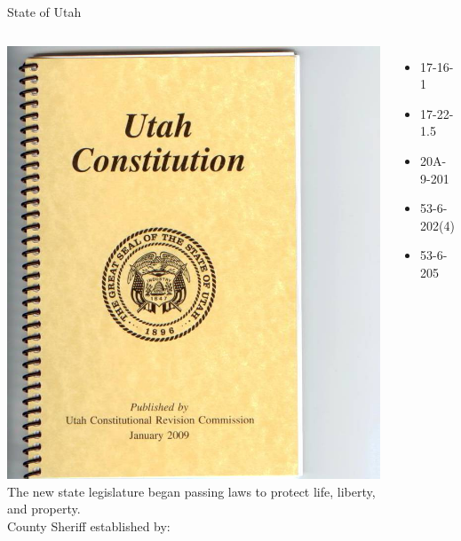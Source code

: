 \begin{frame}{State of Utah}
    \begin{columns}[onlytextwidth]
            \centering
            \includegraphics[height=0.75\textheight]{img/utah-constitution.png} \\

            The new state legislature began passing laws to protect life, liberty, and property. \\
            \vspace{20pt}
            County Sheriff established by:
            \begin{itemize}
                \item 17-16-1
                \item 17-22-1.5
                \item 20A-9-201
                \item 53-6-202(4)
                \item 53-6-205
            \end{itemize}
    \end{columns}
\end{frame}

